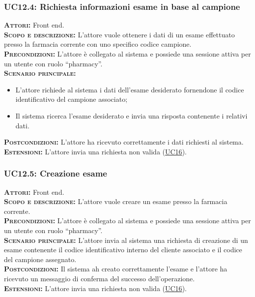 \subsubsection{UC12.4: Richiesta informazioni esame in base al campione}
\label{sec:UC124}
\textsc{\textbf{Attori:}} Front end.\\
\textsc{\textbf{Scopo e descrizione:}} L'attore vuole ottenere i dati di un esame  effettuato presso la farmacia corrente con uno specifico codice campione.\\
\textsc{\textsc{\textbf{Precondizioni:}}} L'attore è collegato al sistema e possiede una sessione attiva per un utente con ruolo ``pharmacy''.\\
\textsc{\textbf{Scenario principale:}}
\begin{itemize}
    \item L'attore richiede al sistema i dati dell'esame desiderato fornendone il codice identificativo del campione associato;
    \item Il sistema ricerca l'esame desiderato e invia una risposta contenente i relativi dati.
\end{itemize} 
\textsc{\textbf{Postcondizioni:}} L'attore ha ricevuto correttamente i dati richiesti al sistema.\\
\textsc{\textbf{Estensioni:}} L'attore invia una richiesta non valida (\hyperref[sec:UC16]{UC16}).

\subsubsection{UC12.5: Creazione esame}
\label{sec:UC125}
\textsc{\textbf{Attori:}} Front end.\\
\textsc{\textbf{Scopo e descrizione:}} L'attore vuole creare un esame presso la farmacia corrente.\\
\textsc{\textsc{\textbf{Precondizioni:}}} L'attore è collegato al sistema e possiede una sessione attiva per un utente con ruolo ``pharmacy''.\\
\textsc{\textbf{Scenario principale:}} L'attore invia al sistema una richiesta di creazione di un esame contenente il codice identificativo interno del cliente associato e il codice del campione assegnato.\\
\textsc{\textbf{Postcondizioni:}} Il sistema ah creato correttamente l'esame e l'attore ha ricevuto un messaggio di conferma del successo dell'operazione.\\
\textsc{\textbf{Estensioni:}} L'attore invia una richiesta non valida (\hyperref[sec:UC16]{UC16}).

